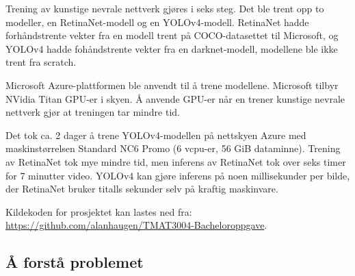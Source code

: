 


Trening av kunstige nevrale nettverk gjøres i seks steg. Det ble trent opp to modeller, en RetinaNet-modell og en YOLOv4-modell. RetinaNet hadde forhåndstrente vekter fra en modell trent på COCO-datasettet til Microsoft, og YOLOv4 hadde fohåndstrente vekter fra en darknet-modell, modellene ble ikke trent fra scratch. \cite{Lin m.fl. 2015 s. 1} %

Microsoft Azure-plattformen ble anvendt til å trene modellene. Microsoft tilbyr NVidia Titan GPU-er i skyen. Å anvende GPU-er når en trener kunstige nevrale nettverk gjør at treningen tar mindre tid. \cite{Dean m.fl. 2012 s. 1}

Det tok ca. 2 dager å trene YOLOv4-modellen på nettskyen Azure med maskinstørrelsen Standard NC6 Promo (6 vcpu-er, 56 GiB dataminne). Trening av RetinaNet tok mye mindre tid, men inferens av RetinaNet tok over seks timer for 7 minutter video. YOLOv4 kan gjøre inferens på noen millisekunder per bilde, der RetinaNet bruker titalls sekunder selv på kraftig maskinvare.%

Kildekoden for prosjektet kan lastes ned fra: \\ \url{https://github.com/alanhaugen/TMAT3004-Bacheloroppgave}.

\subsection{Å forstå problemet}

